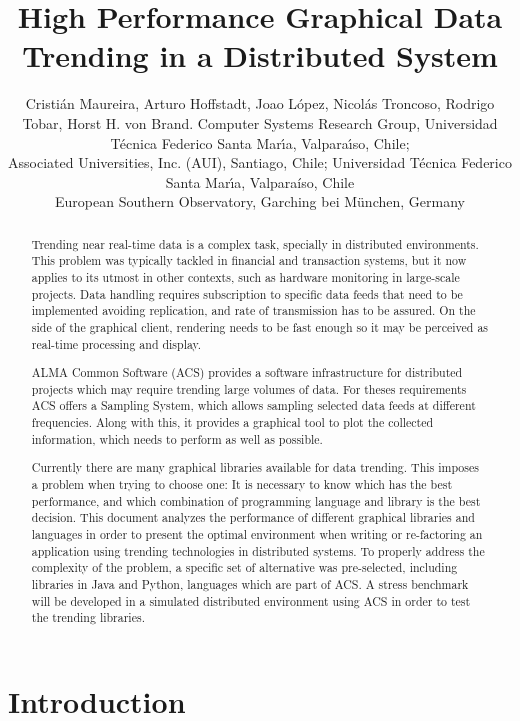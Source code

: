 \documentclass[]{styles/spie}  %
\title{High Performance Graphical Data Trending in a Distributed System}
\author{Cristi\'an Maureira\supit{a},
        Arturo Hoffstadt\supit{a},
        Joao L\'opez\supit{a},
        Nicol\'as Troncoso\supit{b},
        Rodrigo Tobar\supit{c},
        Horst H. von Brand\supit{a}.
\skiplinehalf
\supit{a}Computer Systems Research Group,
          Universidad T\'ecnica Federico Santa Mar\'{\i}a,
          Valpara\'{\i}so, Chile; \\
\supit{b}Associated Universities, Inc. (AUI), Santiago, Chile;
         Universidad T\'ecnica Federico Santa Mar\'{\i}a,
         Valpara\'{i}so, Chile\\
\supit{c}European Southern Observatory,
         Garching bei München, Germany
}
\begin{document}
  \maketitle

\begin{abstract}
Trending near real-time data is a complex task, specially in distributed
environments. This problem was typically tackled in financial and transaction
systems, but it now applies to its utmost in other contexts, such as hardware
monitoring in large-scale projects. Data handling requires subscription to
specific data feeds that need to be implemented avoiding replication, and rate of transmission has to be assured. On the side of the graphical client,
rendering needs to be fast enough so it may be perceived as real-time processing
and display.

ALMA Common Software (ACS) provides a software
infrastructure for distributed projects which may require trending large
volumes of data. For theses requirements ACS offers a Sampling System, which
allows sampling selected data feeds at different frequencies. Along with this,
it provides a graphical tool to plot the collected information, which needs
to perform as well as possible.

Currently there are many graphical libraries available for data trending. This
imposes a problem when trying to choose one: It is necessary to know which has
the best performance, and which combination of programming language and library
is the best decision.
This document analyzes the performance of different graphical libraries and
languages in order to present the optimal environment when writing or
re-factoring an application using trending technologies in distributed systems.
To properly address the complexity of the problem, a specific set of alternative
was pre-selected, including libraries in Java and Python, languages which are
part of ACS. A stress benchmark will be developed in a simulated distributed
environment using ACS in order to test the trending libraries.
\end{abstract}



\section{Introduction}
\label{sec:intro}  %

\end{document}
